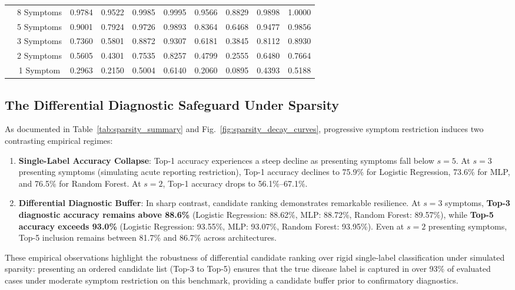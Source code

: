 \begin{table}[!t]
\begin{tabular}{cc|cccc|cccc}
& 8 Symptoms       & 0.9784 & 0.9522 & 0.9985 & 0.9995 & 0.9566 & 0.8829 & 0.9898 & 1.0000 \\
& 5 Symptoms       & 0.9001 & 0.7924 & 0.9726 & 0.9893 & 0.8364 & 0.6468 & 0.9477 & 0.9856 \\
& 3 Symptoms       & 0.7360 & 0.5801 & 0.8872 & 0.9307 & 0.6181 & 0.3845 & 0.8112 & 0.8930 \\
& 2 Symptoms       & 0.5605 & 0.4301 & 0.7535 & 0.8257 & 0.4799 & 0.2555 & 0.6480 & 0.7664 \\
& 1 Symptom        & 0.2963 & 0.2150 & 0.5004 & 0.6140 & 0.2060 & 0.0895 & 0.4393 & 0.5188 \\
\bottomrule
\end{tabular}
\end{table}

\subsection{The Differential Diagnostic Safeguard Under Sparsity}
As documented in Table~\ref{tab:sparsity_summary} and Fig.~\ref{fig:sparsity_decay_curves}, progressive symptom restriction induces two contrasting empirical regimes:
\begin{enumerate}
    \item \textbf{Single-Label Accuracy Collapse}: Top-1 accuracy experiences a steep decline as presenting symptoms fall below $s = 5$. At $s = 3$ presenting symptoms (simulating acute reporting restriction), Top-1 accuracy declines to 75.9\% for Logistic Regression, 73.6\% for MLP, and 76.5\% for Random Forest. At $s = 2$, Top-1 accuracy drops to 56.1\%--67.1\%.
    \item \textbf{Differential Diagnostic Buffer}: In sharp contrast, candidate ranking demonstrates remarkable resilience. At $s = 3$ symptoms, \textbf{Top-3 diagnostic accuracy remains above 88.6\%} (Logistic Regression: 88.62\%, MLP: 88.72\%, Random Forest: 89.57\%), while \textbf{Top-5 accuracy exceeds 93.0\%} (Logistic Regression: 93.55\%, MLP: 93.07\%, Random Forest: 93.95\%). Even at $s = 2$ presenting symptoms, Top-5 inclusion remains between 81.7\% and 86.7\% across architectures.
\end{enumerate}

These empirical observations highlight the robustness of differential candidate ranking over rigid single-label classification under simulated sparsity: presenting an ordered candidate list (Top-3 to Top-5) ensures that the true disease label is captured in over 93\% of evaluated cases under moderate symptom restriction on this benchmark, providing a candidate buffer prior to confirmatory diagnostics.

